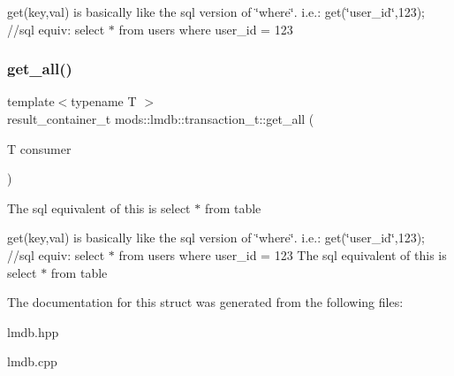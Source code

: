 get(key,val) is basically like the sql version of \char`\"{}where\char`\"{}. i.\+e.\+: get(\char`\"{}user\+\_\+id\char`\"{},123); //sql equiv\+: select $\ast$ from users where user\+\_\+id = 123 \mbox{\label{structmods_1_1lmdb_1_1transaction__t_a89e078b5a572044e71ee239589ea334f}} 
\subsubsection{\texorpdfstring{get\+\_\+all()}{get\_all()}}
{\footnotesize\ttfamily template$<$typename T $>$ \\
result\+\_\+container\+\_\+t mods\+::lmdb\+::transaction\+\_\+t\+::get\+\_\+all (\begin{DoxyParamCaption}\item[{T}]{consumer }\end{DoxyParamCaption})}

The sql equivalent of this is \textquotesingle{}select $\ast$ from table\textquotesingle{}

get(key,val) is basically like the sql version of \char`\"{}where\char`\"{}. i.\+e.\+: get(\char`\"{}user\+\_\+id\char`\"{},123); //sql equiv\+: select $\ast$ from users where user\+\_\+id = 123 The sql equivalent of this is \textquotesingle{}select $\ast$ from table\textquotesingle{} 

The documentation for this struct was generated from the following files\+:\begin{DoxyCompactItemize}
\item 
lmdb.\+hpp\item 
lmdb.\+cpp\end{DoxyCompactItemize}
